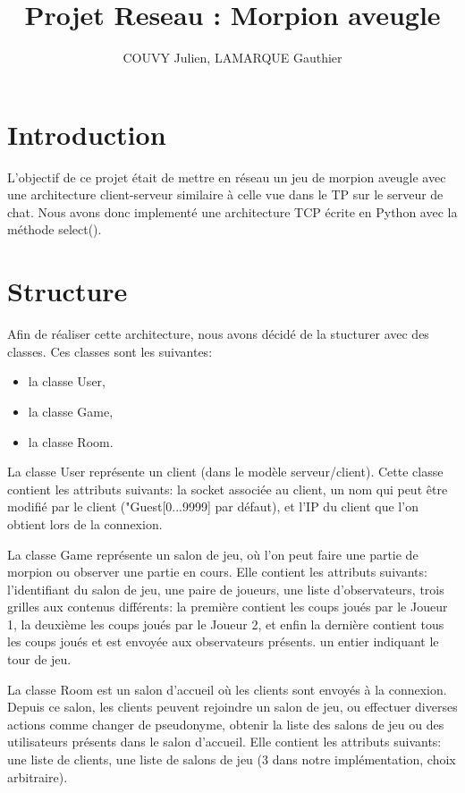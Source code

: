 \documentclass[a4paper]{article}
\title{Projet Reseau : Morpion aveugle}
\author{COUVY Julien, LAMARQUE Gauthier}
\begin{document}
\maketitle

\section{Introduction}
L'objectif de ce projet était de mettre en réseau un jeu de morpion aveugle avec une architecture client-serveur similaire à celle vue dans le TP sur le serveur de chat. Nous avons donc implementé une architecture TCP écrite en Python avec la méthode select().

\section{Structure}

Afin de réaliser cette architecture, nous avons décidé de la stucturer avec des classes.
Ces classes sont les suivantes:
\begin{itemize}
\item la classe User,
\item la classe Game,
\item la classe Room.
\end{itemize}
\bigskip

La classe User représente un client (dans le modèle serveur/client). Cette classe contient les attributs suivants:
la socket associée au client,
un nom qui peut être modifié par le client ("Guest[0...9999] par défaut),
et l'IP du client que l'on obtient lors de la connexion.

La classe Game représente un salon de jeu, où l'on peut faire une partie de morpion ou observer une partie en cours.
Elle contient les attributs suivants:
l'identifiant du salon de jeu,
une paire de joueurs,
une liste d'observateurs,
trois grilles aux contenus différents:
	la première contient les coups joués par le Joueur 1,
	la deuxième les coups joués par le Joueur 2,
	et enfin la dernière contient tous les coups joués et est envoyée aux observateurs présents.
un entier indiquant le tour de jeu.

La classe Room est un salon d'accueil où les clients sont envoyés à la connexion. Depuis ce salon, les clients peuvent rejoindre un salon de jeu, ou effectuer diverses actions comme changer de pseudonyme, obtenir la liste des salons de jeu ou des utilisateurs présents dans le salon d'accueil.
Elle contient les attributs suivants:
une liste de clients,
une liste de salons de jeu (3 dans notre implémentation, choix arbitraire).
\end{document}

